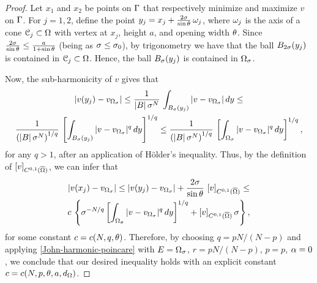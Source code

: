 \documentclass[a4paper,10pt]{amsart}
\numberwithin{equation}{section}
\begin{document}
\begin{proof}
	Let $x_1$ and $x_2$ be points on $\Gamma$ that respectively minimize and maximize $v$ on $\Gamma$. For $j=1, 2$, define the point $y_j = x_j + \frac{2 \sigma }{\sin \theta} \,\omega_j $, where $\omega_j$ is the axis of a cone $\mathcal{C}_{j} \subset \Omega$ with vertex at $x_j$, height $a$, and opening width $\theta$. Since $\frac{2 \sigma  }{\sin \theta} \le \frac{a}{ 1 + \sin \theta}$ (being as $\sigma \le \sigma_0$), by trigonometry we have that the ball $B_{2 \sigma}(y_j)$ is contained in $\mathcal{C}_{j}\subset\Omega$. Hence, the ball $B_{\sigma}(y_j)$ is contained in $\Omega_\sigma$.
\par
Now, the sub-harmonicity of $v$ gives that
\begin{multline*}
|v( y_j ) - v_{\Omega_\sigma} | \le 
\frac{1}{|B|\, \sigma^N }\,\int_{ B_{\sigma}(y_j) }  |v - v_{\Omega_\sigma}| \,dy \le \\
\frac{1}{\left(|B|\, \sigma^N\right)^{1/ q}} \, 
\left[\int_{ B_{\sigma}(y_j) }|v - v_{\Omega_\sigma} |^q \,dy\right]^{1/q} \le 
\frac{1}{\left(|B|\, \sigma^N\right)^{1/ q}} \, 
\left[\int_{\Omega_\sigma}|v - v_{\Omega_\sigma} |^q \,dy\right]^{1/q} ,
\end{multline*}
for any $q > 1$, after an application of H\"older's inequality. Thus,
by the definition of $\left[v\right]_{C^{0,1} ( \overline{\Omega}) }$, we can infer that
\begin{multline*}
| v(x_j) - v_{\Omega_\sigma} | \le | v(y_j) - v_{\Omega_\sigma} | + \frac{2 \sigma }{\sin \theta} \, \left[v\right]_{C^{0,1} ( \overline{\Omega}) }  \le \\	
c\, \left\{ \sigma^{-N/q} \left[\int_{\Omega_\sigma}|v - v_{\Omega_\sigma} |^q \,dy\right]^{1/q}+   \left[v\right]_{C^{0,1} ( \overline{\Omega}) } \sigma   \right\} ,
\end{multline*}
for some constant $c=c(N, q,\theta)$.
Therefore, by choosing $q=pN/(N-p)$ and applying \eqref{John-harmonic-poincare} with $E=\Omega_\sigma$, $r=pN/(N-p)$, $p=p$, $\alpha = 0$, we conclude that
our desired inequality holds with an explicit constant $c=c( N , p, \theta, a , d_\Omega)$.
\end{proof}


%	
%
%
\end{document}
